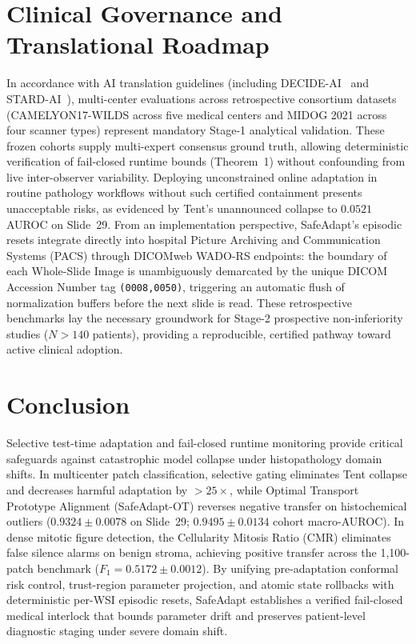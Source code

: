\documentclass[journal]{IEEEtran}
\begin{document}
\section{Clinical Governance and Translational Roadmap}
In accordance with AI translation guidelines (including DECIDE-AI~\cite{decideai2022} and STARD-AI~\cite{stardai2020}), multi-center evaluations across retrospective consortium datasets (CAMELYON17-WILDS across five medical centers and MIDOG 2021 across four scanner types) represent mandatory Stage-1 analytical validation. These frozen cohorts supply multi-expert consensus ground truth, allowing deterministic verification of fail-closed runtime bounds (Theorem~1) without confounding from live inter-observer variability. Deploying unconstrained online adaptation in routine pathology workflows without such certified containment presents unacceptable risks, as evidenced by Tent's unannounced collapse to $0.0521$ AUROC on Slide~29. From an implementation perspective, SafeAdapt's episodic resets integrate directly into hospital Picture Archiving and Communication Systems (PACS) through DICOMweb WADO-RS endpoints: the boundary of each Whole-Slide Image is unambiguously demarcated by the unique DICOM Accession Number tag \texttt{(0008,0050)}, triggering an automatic flush of normalization buffers before the next slide is read. These retrospective benchmarks lay the necessary groundwork for Stage-2 prospective non-inferiority studies ($N > 140$ patients), providing a reproducible, certified pathway toward active clinical adoption.

\section{Conclusion}
Selective test-time adaptation and fail-closed runtime monitoring provide critical safeguards against catastrophic model collapse under histopathology domain shifts. In multicenter patch classification, selective gating eliminates Tent collapse and decreases harmful adaptation by $>25\times$, while Optimal Transport Prototype Alignment (SafeAdapt-OT) reverses negative transfer on histochemical outliers ($0.9324 \pm 0.0078$ on Slide~29; $0.9495 \pm 0.0134$ cohort macro-AUROC). In dense mitotic figure detection, the Cellularity Mitosis Ratio (CMR) eliminates false silence alarms on benign stroma, achieving positive transfer across the 1,100-patch benchmark ($F_1 = 0.5172 \pm 0.0012$). By unifying pre-adaptation conformal risk control, trust-region parameter projection, and atomic state rollbacks with deterministic per-WSI episodic resets, SafeAdapt establishes a verified fail-closed medical interlock that bounds parameter drift and preserves patient-level diagnostic staging under severe domain shift.
\end{document}
